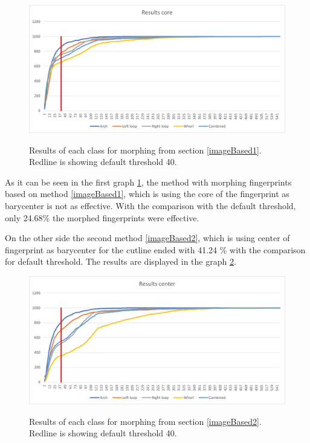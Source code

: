\begin{figure}[H]
    \centering
        {\includegraphics[width=1\linewidth]{obrazky-figures/results_core.png}}\\
        \caption{Results of each class for morphing from section \ref{imageBased1}. Redline is showing default threshold 40.}
        \label{fig:grapf_normal}
\end{figure}

As it can be seen in the first graph \ref{fig:grapf_normal}, the method with morphing fingerprints based on method \ref{imageBased1}, which is using the core of the fingerprint as barycenter is not as effective. With the comparison with the default threshold, only 24.68\% the morphed fingerprints were effective.

On the other side the second method \ref{imageBased2}, which is using center of fingerprint as barycenter for the cutline ended with 41.24 \% with the comparison for default threshold. The results are displayed in the graph \ref{fig:grapf_center}.

\begin{figure}[H]
    \centering
        {\includegraphics[width=1\linewidth]{obrazky-figures/results_center.png}}\\
        \caption{Results of each class for morphing from section \ref{imageBased2}. Redline is showing default threshold 40.}
        \label{fig:grapf_center}
\end{figure}

